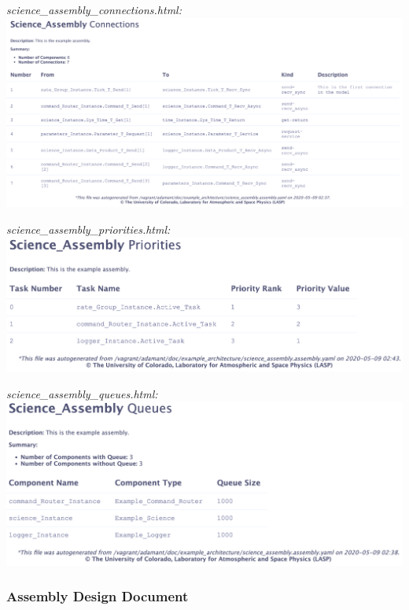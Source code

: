\textit{science\_assembly\_connections.html:} \\

\includegraphics[width=\textwidth]{images/assemblyconnectionshtml.png}
\vspace{7mm} %

\textit{science\_assembly\_priorities.html:} \\

\includegraphics[width=\textwidth]{images/assemblyprioritieshtml.png}
\vspace{7mm} %

\textit{science\_assembly\_queues.html:} \\

\includegraphics[width=\textwidth]{images/assemblyqueueshtml.png}
\vspace{7mm} %

\subsubsection{Assembly Design Document}

